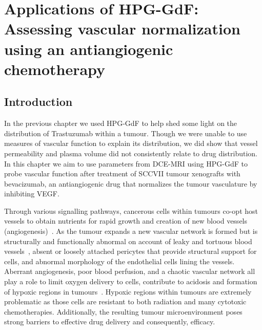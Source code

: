 
\chapter{Applications of \acs{HPG-GdF}: Assessing vascular normalization using an antiangiogenic chemotherapy}
\label{ch:HPG3}

\section{Introduction}

In the previous chapter we used \acs{HPG-GdF} to help shed some light on the distribution of Trastuzumab within a tumour.
Though we were unable to use measures of vascular function to explain its distribution, we did show that vessel permeability and plasma volume did not consistently relate to drug distribution.
In this chapter we aim to use parameters from \acs{DCE-MRI} using \acs{HPG-GdF} to probe vascular function after treatment of SCCVII tumour xenografts with bevacizumab, an antiangiogenic drug that normalizes the tumour vasculature by inhibiting \acs{VEGF}.

Through various signalling pathways, cancerous cells within tumours co-opt host vessels to obtain nutrients for rapid growth and creation of new blood vessels (angiogenesis)~\cite{Jain:2005gk}.
As the tumour expands a new vascular network is formed but is structurally and functionally abnormal on account of leaky and tortuous blood vessels~\cite{McDonald:2002ut}, absent or loosely attached pericytes that provide structural support for cells, and abnormal morphology of the endothelial cells lining the vessels. 
Aberrant angiogenesis, poor blood perfusion, and a chaotic vascular network all play a role to limit oxygen delivery to cells, contribute to acidosis and formation of hypoxic regions in tumours~\cite{Jain:2005gk}.
Hypoxic regions within tumours are extremely problematic as those cells are resistant to both radiation and many cytotoxic chemotherapies.
Additionally, the resulting tumour microenvironment poses strong barriers to effective drug delivery and consequently, efficacy. 

